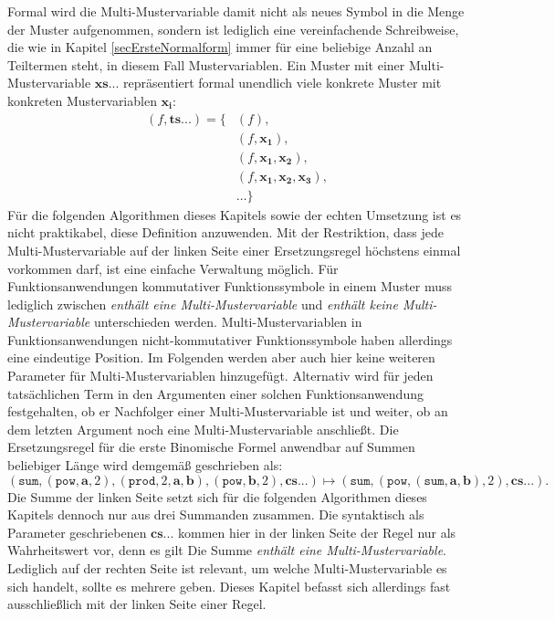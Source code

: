 Formal wird die Multi-Mustervariable damit nicht als neues Symbol in die Menge der Muster aufgenommen, sondern ist lediglich eine vereinfachende Schreibweise, die wie in Kapitel \ref{secErsteNormalform} immer für eine beliebige Anzahl an Teiltermen steht, in diesem Fall Mustervariablen. Ein Muster mit einer Multi-Mustervariable $\mathbf{xs...}$ repräsentiert formal unendlich viele konkrete Muster mit konkreten Mustervariablen $\mathbf{x_i}$:
\begin{equation*}
	\begin{split}
			(f, \mathbf{ts...}) = \{&(f), \\
			&(f, \mathbf{x_1}),\\
			&(f, \mathbf{x_1}, \mathbf{x_2}), \\
			&(f, \mathbf{x_1}, \mathbf{x_2}, \mathbf{x_3}), \\
			&\dots \}    		
	\end{split}
\end{equation*}
Für die folgenden Algorithmen dieses Kapitels sowie der echten Umsetzung ist es nicht praktikabel, diese Definition anzuwenden. Mit der Restriktion, dass jede Multi-Mustervariable auf der linken Seite einer Ersetzungsregel höchstens einmal vorkommen darf, ist eine einfache Verwaltung möglich. Für Funktionsanwendungen kommutativer Funktionssymbole in einem Muster muss lediglich zwischen \textit{enthält eine Multi-Mustervariable} und \textit{enthält keine Multi-Mustervariable} unterschieden werden. Multi-Mustervariablen in Funktionsanwendungen nicht-kommutativer Funktionssymbole haben allerdings eine eindeutige Position. Im Folgenden werden aber auch hier keine weiteren Parameter für Multi-Mustervariablen hinzugefügt. Alternativ wird für jeden tatsächlichen Term in den Argumenten einer solchen Funktionsanwendung festgehalten, ob er Nachfolger einer Multi-Mustervariable ist und weiter, ob an dem letzten Argument noch eine Multi-Mustervariable anschließt. 
Die Ersetzungsregel für die erste Binomische Formel anwendbar auf Summen beliebiger Länge wird demgemäß  geschrieben als:
$$(\texttt{sum}, (\texttt{pow}, \mathbf a, 2), (\texttt{prod}, 2, \mathbf a, \mathbf b), (\texttt{pow}, \mathbf b, 2), \mathbf{cs...}) \mapsto (\texttt{sum}, (\texttt{pow}, (\texttt{sum}, \mathbf a, \mathbf b), 2), \mathbf{cs...}).$$
Die Summe der linken Seite setzt sich für die folgenden Algorithmen dieses Kapitels dennoch nur aus drei Summanden zusammen. Die syntaktisch als Parameter geschriebenen $\mathbf{cs...}$ kommen hier in der linken Seite der Regel nur als Wahrheitswert vor, denn es gilt \glqq Die Summe \textit{enthält eine Multi-Mustervariable}\grqq{}. Lediglich auf der rechten Seite ist relevant, um welche Multi-Mustervariable es sich handelt, sollte es mehrere geben. Dieses Kapitel befasst sich allerdings fast ausschließlich mit der linken Seite einer Regel.



